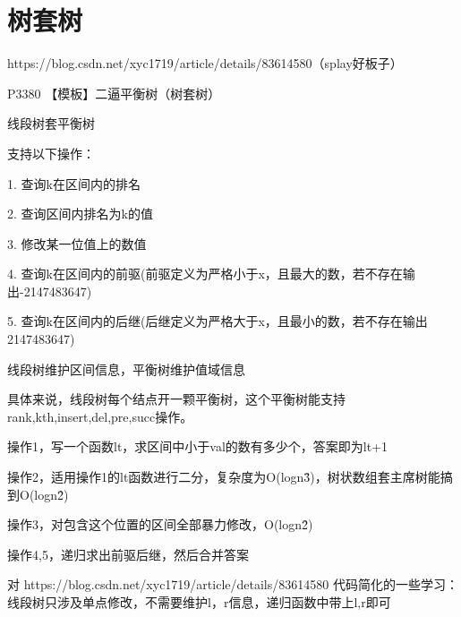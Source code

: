 \section{树套树}

https://blog.csdn.net/xyc1719/article/details/83614580（splay好板子）

P3380 【模板】二逼平衡树（树套树）

线段树套平衡树

支持以下操作：

1. 查询k在区间内的排名

2. 查询区间内排名为k的值

3. 修改某一位值上的数值

4. 查询k在区间内的前驱(前驱定义为严格小于x，且最大的数，若不存在输出-2147483647)

5. 查询k在区间内的后继(后继定义为严格大于x，且最小的数，若不存在输出2147483647)

线段树维护区间信息，平衡树维护值域信息

具体来说，线段树每个结点开一颗平衡树，这个平衡树能支持rank,kth,insert,del,pre,succ操作。

操作1，写一个函数lt，求区间中小于val的数有多少个，答案即为lt+1

操作2，适用操作1的lt函数进行二分，复杂度为O(logn\^3)，树状数组套主席树能搞到O(logn\^2)

操作3，对包含这个位置的区间全部暴力修改，O(logn\^2)

操作4,5，递归求出前驱后继，然后合并答案

对 https://blog.csdn.net/xyc1719/article/details/83614580 代码简化的一些学习：线段树只涉及单点修改，不需要维护l，r信息，递归函数中带上l,r即可


